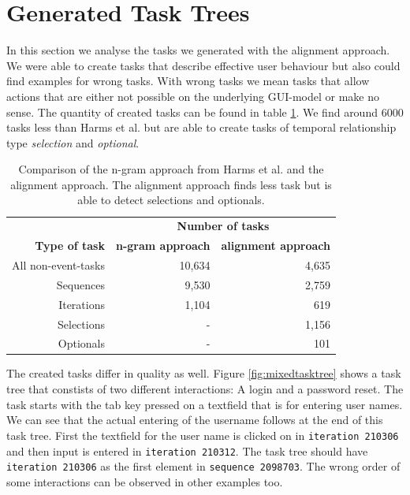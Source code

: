 \section{Generated Task Trees}
In this section we analyse the tasks we generated with the alignment approach. 
We were able to create tasks that describe effective user behaviour but also could find examples for wrong tasks.
With wrong tasks we mean tasks that allow actions that are either not possible on the underlying GUI-model or make no sense.
The quantity of created tasks can be found in table \ref{tab:taskquantity}. 
We find around 6000 tasks less than Harms et al. but are able to create tasks of temporal relationship type \textit{selection} and \textit{optional}.

\begin{table}
	\centering
	\begin{tabular}{ r r r }
	   \toprule
	    & \multicolumn{2}{c}{\textbf{Number of tasks}} \\
		\cmidrule{2-3}
		\textbf{Type of task}& \textbf{n-gram approach} & \textbf{alignment approach} \\
	   \midrule
	   All non-event-tasks 	& 10,634 			& 4,635 \\
		\midrule
	   Sequences 				& 9,530 				& 2,759 \\
	   Iterations 				& 1,104 				& 619 \\
	   Selections 				& -\hspace{12pt}	& 1,156 \\
	   Optionals 				& -\hspace{12pt} 	& 101 \\
	   \bottomrule
\end{tabular}
\caption{Comparison of the n-gram approach from Harms et al. and the alignment approach. The alignment approach finds less task but is able to detect selections and optionals.}
\label{tab:taskquantity}
\end{table}

The created tasks differ in quality as well. 
Figure \ref{fig:mixedtasktree} shows a task tree that constists of two different interactions: A login and a password reset.
The task starts with the tab key pressed on a textfield that is for entering user names. 
We can see that the actual entering of the username follows at the end of this task tree. 
First the textfield for the user name is clicked on in \texttt{iteration 210306} and then input is entered in \texttt{iteration 210312}. 
The task tree should have \texttt{iteration 210306} as the first element in \texttt{sequence 2098703}.
The wrong order of some interactions can be observed in other examples too.  

